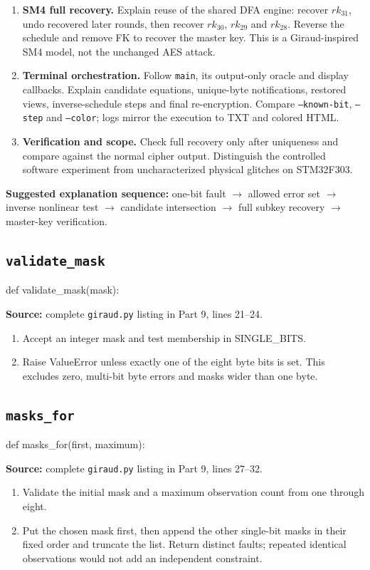 \begin{enumerate}
\item \textbf{SM4 full recovery.} Explain reuse of the shared DFA engine: recover $rk_{31}$, undo recovered later rounds, then recover $rk_{30}$, $rk_{29}$ and $rk_{28}$. Reverse the schedule and remove FK to recover the master key. This is a Giraud-inspired SM4 model, not the unchanged AES attack.
\item \textbf{Terminal orchestration.} Follow \texttt{main}, its output-only oracle and display callbacks. Explain candidate equations, unique-byte notifications, restored views, inverse-schedule steps and final re-encryption. Compare \texttt{--known-bit}, \texttt{--step} and \texttt{--color}; logs mirror the execution to TXT and colored HTML.
\item \textbf{Verification and scope.} Check full recovery only after uniqueness and compare against the normal cipher output. Distinguish the controlled software experiment from uncharacterized physical glitches on STM32F303.
\end{enumerate}
\noindent\textbf{Suggested explanation sequence:} one-bit fault $\rightarrow$ allowed error set $\rightarrow$ inverse nonlinear test $\rightarrow$ candidate intersection $\rightarrow$ full subkey recovery $\rightarrow$ master-key verification.

\subsection{\texttt{validate\_\allowbreak{}mask}}
\begin{lightcode}
def validate_mask(mask):
\end{lightcode}
\noindent\textbf{Source:} complete \texttt{giraud.py} listing in Part 9, lines 21--24.
\begin{enumerate}
\item Accept an integer mask and test membership in SINGLE\_BITS.
\item Raise ValueError unless exactly one of the eight byte bits is set. This excludes zero, multi-bit byte errors and masks wider than one byte.
\end{enumerate}
\subsection{\texttt{masks\_\allowbreak{}for}}
\begin{lightcode}
def masks_for(first, maximum):
\end{lightcode}
\noindent\textbf{Source:} complete \texttt{giraud.py} listing in Part 9, lines 27--32.
\begin{enumerate}
\item Validate the initial mask and a maximum observation count from one through eight.
\item Put the chosen mask first, then append the other single-bit masks in their fixed order and truncate the list. Return distinct faults; repeated identical observations would not add an independent constraint.
\end{enumerate}
